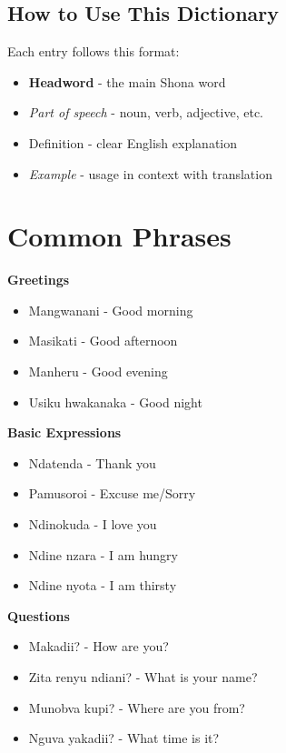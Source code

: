 \documentclass[10pt,twoside]{book}
\begin{document}
\section*{How to Use This Dictionary}

Each entry follows this format:
\begin{itemize}
\item \textbf{Headword} - the main Shona word
\item \textit{Part of speech} - noun, verb, adjective, etc.
\item Definition - clear English explanation
\item \textit{Example} - usage in context with translation
\end{itemize}

\mainmatter


\backmatter

\appendix

\chapter{Common Phrases}
\begin{multicols}{2}
\RaggedRight

\textbf{Greetings}
\begin{itemize}[leftmargin=*]
\item Mangwanani - Good morning
\item Masikati - Good afternoon  
\item Manheru - Good evening
\item Usiku hwakanaka - Good night
\end{itemize}

\textbf{Basic Expressions}
\begin{itemize}[leftmargin=*]
\item Ndatenda - Thank you
\item Pamusoroi - Excuse me/Sorry
\item Ndinokuda - I love you
\item Ndine nzara - I am hungry
\item Ndine nyota - I am thirsty
\end{itemize}

\textbf{Questions}
\begin{itemize}[leftmargin=*]
\item Makadii? - How are you?
\item Zita renyu ndiani? - What is your name?
\item Munobva kupi? - Where are you from?
\item Nguva yakadii? - What time is it?
\end{itemize}

\end{multicols}
\end{document}

